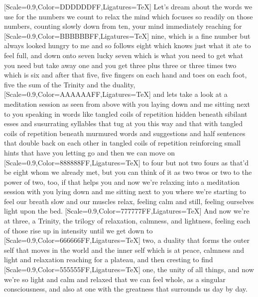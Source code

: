 {\large{}[Scale=0.9,Color=DDDDDDFF,Ligatures=TeX] Let's dream about the words we use for the numbers we count to relax the mind which focuses so readily on those numbers, counting slowly down from ten, your mind immediately reaching for}
{\normalsize{}[Scale=0.9,Color=BBBBBBFF,Ligatures=TeX] nine, which is a fine number but always looked hungry to me and so follows eight which knows just what it ate to feel full, and down onto seven lucky seven which is what you need to get what you need but take away one and you get three plus three or three times two which is six and after that five, five fingers on each hand and toes on each foot, five the sum of the Trinity and the duality,}
{[Scale=0.9,Color=AAAAAAFF,Ligatures=TeX] and lets take a look at a meditation session as seen from above with you laying down and me sitting next to you
speaking in words like tangled coils of repetition hidden beneath sibilant esses and susurrating syllables that tug at you this way and that with tangled coils of repetition beneath murmured words and suggestions and half sentences that double back on each other in tangled coils of repetition reinforcing small hints that have you letting go and then we can move on}
{\small{}[Scale=0.9,Color=888888FF,Ligatures=TeX] to four but not two fours as that'd be eight whom we already met, but you can think of it as two twos or two to the power of two, too, if that helps you and now we're relaxing into a meditation session with you lying down and me sitting next to you where we're starting to feel our breath slow and our muscles relax, feeling calm and still, feeling ourselves light upon the bed.}
{\footnotesize{}[Scale=0.9,Color=777777FF,Ligatures=TeX] And now we're at three, a Trinity, the trilogy of relaxation, calmness, and lightness, feeling each of those rise up in intensity until we get down to}
{\scriptsize{}[Scale=0.9,Color=666666FF,Ligatures=TeX] two, a duality that forms the outer self that moves in the world and the inner self which is at peace, calmness and light and relaxation reaching for a plateau, and then cresting to find}
{\tiny{}[Scale=0.9,Color=555555FF,Ligatures=TeX] one, the unity of all things, and now we're so light and calm and relaxed that we can feel whole, as a singular consciousness, and also at one with the greatness that surrounds us day by day.}
